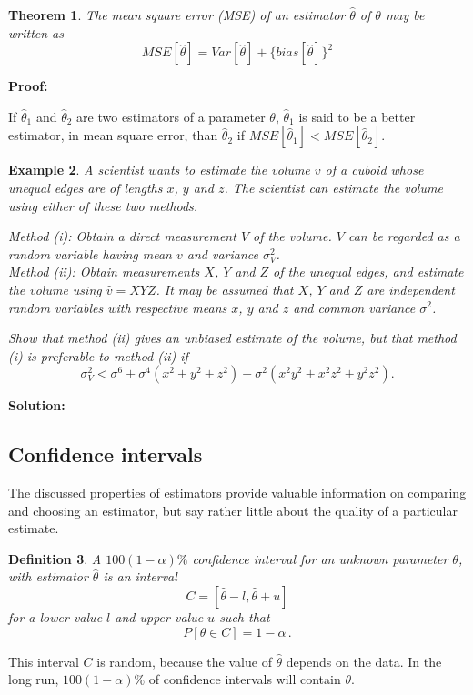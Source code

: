 \documentclass[12pt]{article}
\newtheorem{theorem}{Theorem}[section]
\newtheorem{definition}[theorem]{Definition}
\newtheorem{example}[theorem]{Example}
\begin{document}
\begin{theorem}
The mean square error (MSE) of an estimator $\hat{\theta}$ of $\theta$ may be written as $$MSE[\hat{\theta}]=Var[\hat{\theta}]+\{bias[\hat{\theta}]\}^2$$
\end{theorem}
\begin{mdframed}
{\bf Proof:}
\textcolor[rgb]{1.00,1.00,1.00}{\lipsum[1-3]}
\end{mdframed}

If $\hat{\theta}_{1}$ and $\hat{\theta}_{2}$ are two estimators of a parameter $\theta$, $\hat{\theta}_{1}$ is said to be a better estimator, in mean square error, than $\hat{\theta}_{2}$ if $MSE[\hat{\theta}_{1}]<MSE[\hat{\theta}_{2}]$.


\begin{example}
A scientist wants to estimate the volume $v$ of a cuboid whose unequal edges are of lengths $x$, $y$ and $z$. The scientist can estimate the volume using either of these two methods.

\emph{Method (i): Obtain a direct measurement $V$ of the volume. $V$ can be regarded as a random variable having mean $v$ and variance $\sigma_{V}^{2}$. \\
      Method (ii): Obtain measurements $X$, $Y$ and $Z$ of the unequal edges, and estimate the volume using $\hat{v}=XYZ$. It may be assumed that $X$, $Y$ and $Z$ are independent random variables with respective means $x$, $y$ and $z$ and common variance $\sigma^{2}$.}

Show that method (ii) gives an unbiased estimate of the volume, but that method (i) is preferable to method (ii) if $$\sigma_{V}^{2}<\sigma^{6}+\sigma^{4}(x^{2}+y^{2}+z^{2})+\sigma^{2}(x^{2}y^{2}+x^{2}z^{2}+y^{2}z^{2}).$$
\end{example}

\begin{mdframed}
{\bf Solution:}
\textcolor[rgb]{1.00,1.00,1.00}{\lipsum[1-8]}
\end{mdframed}



\subsection{Confidence intervals}
The discussed properties of estimators provide valuable information on comparing and choosing an estimator, but say rather little about the quality of a particular estimate.
\begin{definition}
 A $100(1-\alpha)\%$ confidence interval for an unknown parameter $\theta$, with estimator $\hat{\theta}$ is an interval
$$C=[\hat{\theta}-l,\hat{\theta}+u]$$
for a lower value $l$ and upper value $u$ such that
$$P[\theta \in C]=1-\alpha\, .$$
\end{definition}
This interval $C$ is random, because the value of $\hat{\theta}$ depends on the data.  In the long run, $100(1 - \alpha)\%$ of confidence intervals will contain $\theta$.
\end{document}
